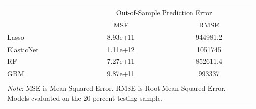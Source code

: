 \begin{tabular}{l*{2}{c}} 
\\[-1.8ex]\hline \hline \\[-1.8ex] 
& \multicolumn{2}{c}{Out-of-Sample Prediction Error} 
\\ \midrule
                    &         MSE&        RMSE\\
\midrule
Lasso               &    8.93e+11&    944981.2\\
ElasticNet          &    1.11e+12&     1051745\\
RF                  &    7.27e+11&    852611.4\\
GBM                 &    9.87e+11&      993337\\
\hline \hline \\[-1.8ex] 
\multicolumn{3}{p{\linewidth}}{\small 
\noindent \textit{Note}: MSE is Mean Squared Error. 
RMSE is Root Mean Squared Error. Models evaluated 
on the 20 percent testing sample.} 
\end{tabular}
